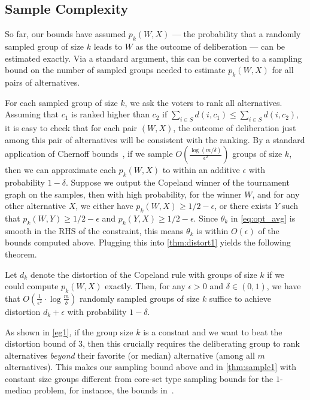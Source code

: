 \subsection{Sample Complexity}
So far, our bounds have assumed $p_k(W,X)$ --- the probability that a randomly sampled group of size $k$ leads to $W$ as the outcome of deliberation --- can be estimated exactly. Via a standard argument, this can be converted to a sampling bound on the number of sampled groups needed to estimate $p_k(W,X)$ for all pairs of alternatives.

For each sampled group of size $k$, we ask the voters to rank all alternatives. Assuming that $c_1$ is ranked higher than $c_2$ if $\sum_{i \in S} d(i,c_1) \le \sum_{i \in S} d(i,c_2)$, it is easy to check that for each pair $(W,X)$, the outcome of deliberation just among this pair of alternatives will be consistent with the ranking. By a standard application of Chernoff bounds~\cite{Boucheron}, if we sample $O\left(\frac{\log (m/\delta)}{\epsilon^2}\right)$ groups of size $k$, then we can approximate each $p_k(W,X)$ to within an additive $\epsilon$ with probability $1-\delta$.  Suppose we output the Copeland winner of the tournament graph on the samples, then with high probability, for the winner $W$, and for any other alternative $X$, we either have $p_k(W,X) \ge 1/2 - \epsilon$, or there exists $Y$ such that $p_k(W,Y) \ge 1/2 - \epsilon$ and $p_k(Y,X) \ge 1/2 - \epsilon$. Since $\theta_k$ in \cref{eq:opt_avg} is smooth in the RHS of the constraint, this means $\theta_k$ is within $O(\epsilon)$ of the bounds computed above.  Plugging this into \cref{thm:distort1} yields the following theorem.

\begin{theorem}
\label{thm:sample2}
Let $d_k$ denote the distortion of the Copeland rule with groups of size $k$ if we could compute $p_k(W,X)$ exactly. Then, for any $\epsilon > 0$ and $\delta \in (0,1)$, we have that $O\left(\frac{1}{\epsilon^2} \cdot \log \frac{m}{\delta}\right)$ randomly sampled groups of size $k$ suffice to achieve distortion $d_k + \epsilon$ with probability $1-\delta$.
\end{theorem}

As shown in \cref{eg1},  if the group size $k$ is a constant and we want to beat the distortion bound of $3$, then this crucially requires the deliberating group to rank alternatives {\em beyond} their favorite (or median) alternative (among all $m$ alternatives). %
This makes our sampling bound above and in \cref{thm:sample1} with constant size groups different from core-set type sampling bounds for the $1$-median problem, for instance, the bounds in~\cite{CaragiannisM024}. 